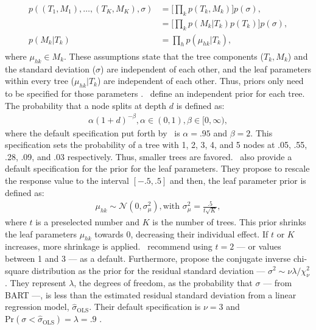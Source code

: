 \documentclass[3p,12pt,a4paper]{elsarticle}
\begin{document}
\begin{align}
\begin{split}
    \label{eq:independence_prior}
    p((T_1, M_1), \dots, (T_K, M_K), \sigma) &= \Big[\prod_{k}p(T_k, M_k)\Big]p(\sigma), \\
    &= \Big[\prod_{k}p(M_k|T_k)p(T_k)\Big]p(\sigma), \\
    p(M_k|T_k) &= \prod_{h}p(\mu_{hk}|T_k),
\end{split}
\end{align} where $\mu_{hk} \in M_k$. These assumptions state that the tree components ($T_{k}, M_{k}$) and the standard deviation ($\sigma$) are independent of each other, and the leaf parameters within every tree ($\mu_{hk}|T_{k}$) are independent of each other. Thus, priors only need to be specified for those parameters \citep{chipman2010, hill2020, chipman2006, chipman1998}.~\citet{chipman1998} define an independent prior for each tree. The probability that a node splits at depth $d$ is defined as: 
\begin{align}
\label{eq:tree_prior}
    \alpha(1+d)^{-\beta}, \alpha \in (0,1), \beta \in [0, \infty),
\end{align} where the default specification put forth by~\citet{chipman2006,chipman2010} is $\alpha = .95$ and $\beta = 2$. This specification sets the probability of a tree with 1, 2, 3, 4, and 5 nodes at .05, .55, .28, .09, and .03 respectively. Thus, smaller trees are favored.~\citet{chipman2006,chipman2010} also provide a default specification for the prior for the leaf parameters. They propose to rescale the response value to the interval $[-.5,.5]$ and then, the leaf parameter prior is defined as: 
\begin{align}
\label{eq:leaf_prior}
    \mu_{hk} \sim \mathcal{N}(0, \sigma^2_{\mu}), \text{with } \sigma^2_{\mu} = \frac{.5}{t\sqrt{K}},
\end{align} where $t$ is a preselected number and $K$ is the number of trees. This prior shrinks the leaf parameters $\mu_{hk}$ towards 0, decreasing their individual effect. If $t$ or $K$ increases, more shrinkage is applied.~\citet{chipman2006,chipman2010} recommend using $t = 2$ --- or values between 1 and 3 --- as a default. Furthermore, \citet{chipman2006,chipman2010} propose the conjugate inverse chi-square distribution as the prior for the residual standard deviation --- $\sigma^2 \sim \nu\lambda/\chi^{2}_{\nu}$. They represent $\lambda$, the degrees of freedom, as the probability that $\sigma$ --- from BART ---, is less than the estimated residual standard deviation from a linear regression model, $\hat{\sigma}_\text{OLS}$. Their default specification is $\nu = 3$ and $\text{Pr}(\sigma < \hat{\sigma}_\text{OLS}) = \lambda = .9$ \citep{chipman2010, hill2020, chipman2006, chipman1998}.
\end{document}
